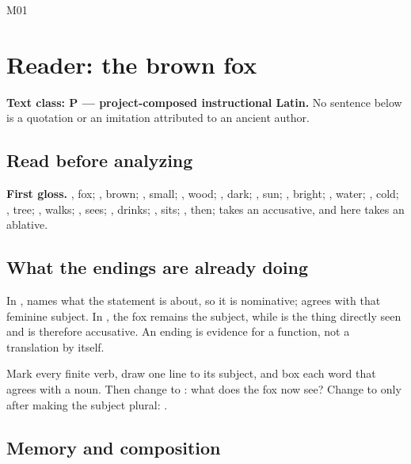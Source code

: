 
\begin{courseunit}{M01}
\chapter{Reader: the brown fox}

\textbf{Text class: P --- project-composed instructional Latin.} No sentence
below is a quotation or an imitation attributed to an ancient author.

\section{Read before analyzing}


\textbf{First gloss.} , fox; , brown;
, small; , wood; , dark;
, sun; , bright; , water;
, cold; , tree; , walks;
, sees; , drinks; , sits;
, then;  takes an accusative, and  here
takes an ablative.

\section{What the endings are already doing}

In ,  names what the statement is about,
so it is nominative;  agrees with that feminine subject.  In
, the fox remains the subject, while 
is the thing directly seen and is therefore accusative.  An ending is evidence
for a function, not a translation by itself.

Mark every finite verb, draw one line to its subject, and box each word that
agrees with a noun.  Then change  to : what does the
fox now see?  Change  to  only after making the
subject plural: .

\section{Memory and composition}


\end{courseunit}

